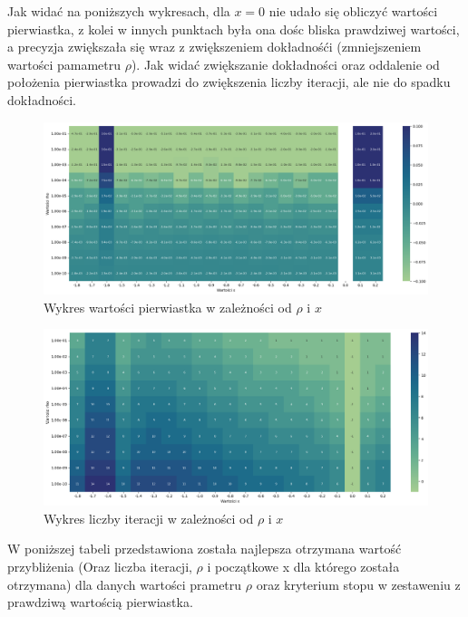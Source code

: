 \documentclass{article}
\begin{document}
Jak widać na poniższych wykresach, dla \(x = 0\) nie udało się obliczyć wartości pierwiastka, z kolei w innych punktach była ona dośc bliska prawdziwej wartości, a precyzja zwiększała się wraz z zwiększeniem dokładnośći (zmniejszeniem wartości pamametru \(\rho\)). Jak widać zwiększanie dokładności oraz oddalenie od położenia pierwiastka prowadzi do zwiększenia liczby iteracji, ale nie do spadku dokładności.

\begin{figure}[H]
  \centering
  \begin{minipage}[b]{\textwidth}
    \includegraphics[width=\textwidth]{heatmap01.png}
  \end{minipage}
  \caption{Wykres wartości pierwiastka w zależności od \(\rho\) i \(x\)}
\end{figure}

\begin{figure}[H]
  \centering
  \begin{minipage}[b]{\textwidth}
    \includegraphics[width=\textwidth]{heatmap02.png}
  \end{minipage}
  \caption{Wykres liczby iteracji w zależności od \(\rho\) i \(x\)}
\end{figure}

\noindent
W poniższej tabeli przedstawiona została najlepsza otrzymana wartość przybliżenia (Oraz liczba iteracji, \(\rho\) i początkowe x dla którego została otrzymana) dla danych wartości prametru \(\rho\) oraz kryterium stopu w zestaweniu z prawdziwą wartością pierwiastka.
\end{document}
